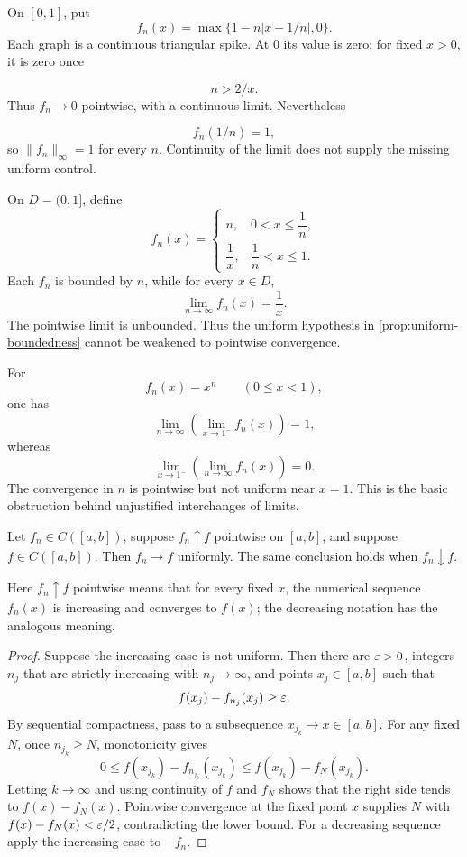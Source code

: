 \begin{example}
On $[0,1]$, put
\[
f_n(x)=\max\{1-n|x-1/n|,0\}.
\]
 Each graph is a continuous
triangular spike. At $0$ its value is zero; for fixed $x>0$, it is zero once

\[
n>2/x.
\]
 Thus $f_n\to0$ pointwise, with a continuous limit. Nevertheless

\[
f_n(1/n)=1,
\]
 so $\|f_n\|_\infty=1$ for every $n$. Continuity of the limit
does not supply the missing uniform control.
\end{example}

\begin{example}
On $D=(0,1]$, define
\[
f_n(x)=
\begin{cases}
n,&0<x\leq\dfrac1n,\\
\dfrac1x,&\dfrac1n<x\leq1.
\end{cases}
\]
Each $f_n$ is bounded by $n$, while for every $x\in D$,
\[
\lim_{n\to\infty}f_n(x)=\frac1x.
\]
The pointwise limit is unbounded. Thus the uniform hypothesis in \cref{prop:uniform-boundedness} cannot be weakened to pointwise convergence.
\end{example}

\begin{example}
For
\[
f_n(x)=x^n
\qquad(0\leq x<1),
\]
one has
\[
\lim_{n\to\infty}\left(\lim_{x\to1^-}f_n(x)\right)=1,
\]
whereas
\[
\lim_{x\to1^-}\left(\lim_{n\to\infty}f_n(x)\right)=0.
\]
The convergence in $n$ is pointwise but not uniform near $x=1$. This is the basic obstruction behind unjustified interchanges of limits.
\end{example}

\begin{theorem}
\label{thm:dini-riemann}
Let \(f_n\in C([a,b])\), suppose \(f_n\uparrow f\) pointwise on \([a,b]\),
and suppose \(f\in C([a,b])\). Then \(f_n\to f\) uniformly. The same
conclusion holds when \(f_n\downarrow f\).
\end{theorem}
Here $f_n\uparrow f$ pointwise means that for every fixed $x$, the numerical
sequence $f_n(x)$ is increasing and converges to $f(x)$; the decreasing
notation has the analogous meaning.
\begin{proof}
Suppose the increasing case is not uniform. Then there are \(\varepsilon>0\), integers
\(n_j\) that are strictly increasing with $n_j\to\infty$, and points \(x_j\in[a,b]\) such that
\[
f(x_j)-f_{n_j}(x_j)\geq\varepsilon.
\]
By sequential compactness, pass to a subsequence \(x_{j_k}\to x\in[a,b]\).
For any fixed \(N\), once \(n_{j_k}\geq N\), monotonicity gives
\[
0\leq f(x_{j_k})-f_{n_{j_k}}(x_{j_k})
\leq f(x_{j_k})-f_N(x_{j_k}).
\]
Letting \(k\to\infty\) and using continuity of \(f\) and \(f_N\) shows
that the right side tends to \(f(x)-f_N(x)\). Pointwise convergence at
the fixed point \(x\) supplies \(N\) with
\(f(x)-f_N(x)<\varepsilon/2\), contradicting the lower bound. For a decreasing
sequence apply the increasing case to \(-f_n\).
\end{proof}


